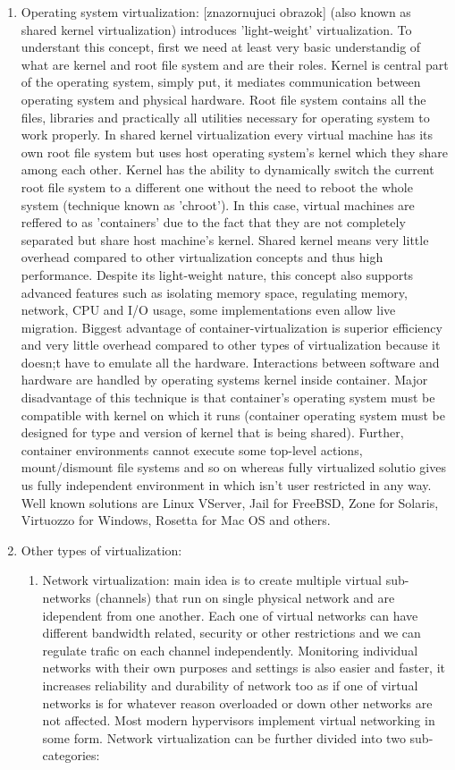 \begin{itemize}
\begin{enumerate}
\item Operating system virtualization: [znazornujuci obrazok] (also known as shared kernel virtualization) introduces 'light-weight' virtualization. To understant this concept, first we need at least very basic understandig of what are kernel and root file system and are their roles. Kernel is central part of the operating system, simply put, it mediates communication between operating system and physical hardware. Root file system contains all the files, libraries and practically all utilities necessary for operating system to work properly. In shared kernel virtualization every virtual machine has its own root file system but uses host operating system's kernel which they share among each other. Kernel has the ability to dynamically switch the current root file system to a different one without the need to reboot the whole system (technique known as 'chroot'). In this case, virtual machines are reffered to as 'containers' due to the fact that they are not completely separated but share host machine's kernel. Shared kernel means very little overhead compared to other virtualization concepts and thus high performance. Despite its light-weight nature, this concept also supports advanced features such as isolating memory space, regulating memory, network, CPU and I/O usage, some implementations even allow live migration. Biggest advantage of container-virtualization is superior efficiency and very little overhead compared to other types of virtualization because it doesn;t have to emulate all the hardware. Interactions between software and hardware are handled by operating systems kernel inside container. Major disadvantage of this technique is that container's operating system must be compatible with kernel on which it runs (container operating system must be designed for type and version of kernel that is being shared). Further, container environments cannot execute some top-level actions, mount/dismount file systems and so on whereas fully virtualized solutio gives us fully independent environment in which isn't user restricted in any way.
Well known solutions are Linux VServer, Jail for FreeBSD, Zone for Solaris, Virtuozzo for Windows, Rosetta for Mac OS and others.

\item Other types of virtualization:
\begin{enumerate}
\item Network virtualization: main idea is to create multiple virtual sub-networks (channels) that run on single physical network and are idependent from one another. Each one of virtual networks can have different bandwidth related, security or other restrictions and we can regulate trafic on each channel independently.  Monitoring individual networks with their own purposes and settings is also easier and faster, it increases reliability and durability of network too as if one of virtual networks is for whatever reason overloaded or down other networks are not affected. Most modern hypervisors implement virtual networking in some form. Network virtualization can be further divided into two sub-categories:
\begin{enumerate}


\end{enumerate}
\end{enumerate}
\end{enumerate}
\end{itemize}
